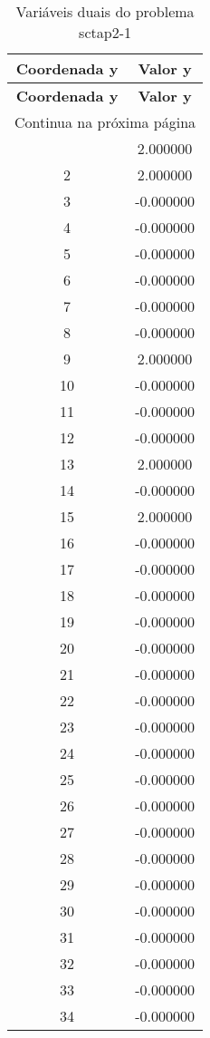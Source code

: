 \documentclass[12pt]{article}
\begin{document}
\begin{longtable}{@{}cc@{}}
\caption{Variáveis duais do problema sctap2-1} \\
\toprule
\textbf{Coordenada y} & \textbf{Valor y} \\
\midrule
\endfirsthead

\toprule
\textbf{Coordenada y} & \textbf{Valor y} \\
\midrule
\endhead

\midrule \multicolumn{2}{r}{{Continua na próxima página}} \\ \midrule
\endfoot

\bottomrule
\endlastfoot
1 & 2.000000 \\
2 & 2.000000 \\
3 & -0.000000 \\
4 & -0.000000 \\
5 & -0.000000 \\
6 & -0.000000 \\
7 & -0.000000 \\
8 & -0.000000 \\
9 & 2.000000 \\
10 & -0.000000 \\
11 & -0.000000 \\
12 & -0.000000 \\
13 & 2.000000 \\
14 & -0.000000 \\
15 & 2.000000 \\
16 & -0.000000 \\
17 & -0.000000 \\
18 & -0.000000 \\
19 & -0.000000 \\
20 & -0.000000 \\
21 & -0.000000 \\
22 & -0.000000 \\
23 & -0.000000 \\
24 & -0.000000 \\
25 & -0.000000 \\
26 & -0.000000 \\
27 & -0.000000 \\
28 & -0.000000 \\
29 & -0.000000 \\
30 & -0.000000 \\
31 & -0.000000 \\
32 & -0.000000 \\
33 & -0.000000 \\
34 & -0.000000 \\

\end{longtable}
\end{document}
